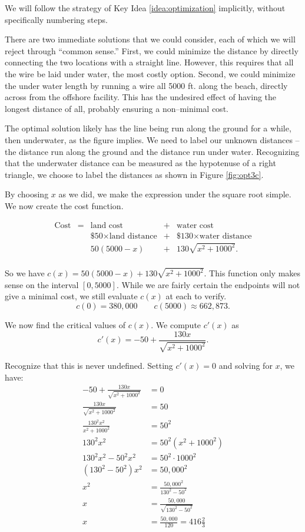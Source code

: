 {We will follow the strategy of Key Idea \ref{idea:optimization} implicitly, without specifically numbering steps.

There are two immediate solutions that we could consider, each of which we will reject through ``common sense.'' First, we could minimize the distance by directly connecting the two locations with a straight line. However, this requires that all the wire be laid under water, the most costly option. Second, we could minimize the under water length by running a wire all 5000 ft. along the beach, directly across from the offshore facility. This has the undesired effect of having the longest distance of all, probably ensuring a non--minimal cost.

The optimal solution likely has the line being run along the ground for a while, then underwater, as the figure implies. We need to label our unknown distances -- the distance run along the ground and the distance run under water. Recognizing that the underwater distance can be measured as the hypotenuse of a right triangle, we choose to label the distances as shown in Figure \ref{fig:opt3c}.


By choosing $x$ as we did, we make the expression under the square root simple. We now create the cost function. 

$$
\begin{array}{ccccc}
\text{Cost} &=&  \text{land cost} &+ & \text{water cost} \\
						&	& \text{\$50}\times \text{land distance} &+& \text{\$130}\times \text{water distance} \\
						&	& 50(5000-x) &+& 130\sqrt{x^2+1000^2}.\\
\end{array}
$$

So we have $c(x) = 50(5000-x)+ 130\sqrt{x^2+1000^2}$. This function only makes sense on the interval $[0,5000]$. While we are fairly certain the endpoints will not give a minimal cost, we still evaluate $c(x)$ at each to verify.
$$c(0) = 380,000 \quad\quad c(5000) \approx 662,873.$$

We now find the critical values of $c(x)$. We compute $c'(x)$ as 
$$c'(x) = -50+\frac{130x}{\sqrt{x^2+1000^2}}.$$

Recognize that this is never undefined. Setting $c'(x)=0$ and solving for $x$, we have:
\begin{align*}
-50+\frac{130x}{\sqrt{x^2+1000^2}} &= 0 \\
\frac{130x}{\sqrt{x^2+1000^2}}  &= 50\\
\frac{130^2x^2}{x^2+1000^2} &= 50^2\\
130^2x^2 &= 50^2(x^2+1000^2) \\
130^2x^2-50^2x^2 &= 50^2\cdot1000^2\\
(130^2-50^2)x^2 &= 50,000^2\\
x^2 &= \frac{50,000^2}{130^2-50^2}\\
x &= \frac{50,000}{\sqrt{130^2-50^2}}\\
x & = \frac{50,000}{120} =416\frac23
\end{align*}

}
